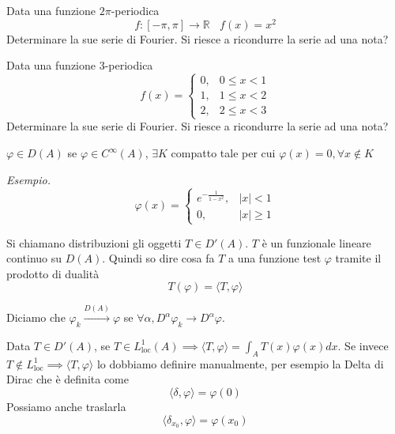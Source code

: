 Data una funzione $2\pi $-periodica
\begin{equation*}
f:[ -\pi ,\pi ]\rightarrow \mathbb{R} \ \ \ \ f(x)=x^{2}
\end{equation*}
Determinare la sue serie di Fourier. Si riesce a ricondurre la serie ad una nota?
\Esercizio{}

Data una funzione $3$-periodica
\begin{equation*}
f(x)=\begin{cases}
0, & 0\leq x< 1\\
1, & 1\leq x< 2\\
2, & 2\leq x< 3
\end{cases}
\end{equation*}
Determinare la sue serie di Fourier. Si riesce a ricondurre la serie ad una nota?
\Esercizio{}
\begin{defn}
 $\varphi \in D( A)$ se $\varphi \in C^{\infty }( A)$, $\exists K$ compatto tale per cui $\varphi ( x) =0,\forall x\notin K$
\end{defn}
\textit{Esempio.}
\begin{equation*}
\varphi ( x) =\begin{cases}
e^{-\frac{1}{1-x^{2}}} , & | x| < 1\\
0, & | x| \geqslant 1
\end{cases}
\end{equation*}
\begin{defn}
[Distribuzione] Si chiamano distribuzioni gli oggetti $T\in D'( A)$. $T$ è un funzionale lineare continuo su $D( A)$. Quindi so dire cosa fa $T$ a una funzione test $\varphi $ tramite il prodotto di dualità
\begin{equation*}
T( \varphi ) =\langle T,\varphi \rangle 
\end{equation*}
\end{defn}
\begin{defn}
 Diciamo che $\varphi _{k}\xrightarrow{D( A)} \varphi $ se $\forall \alpha ,D^{\alpha } \varphi _{k}\rightarrow D^{\alpha } \varphi $.
\end{defn}
\begin{defn}
 Data $T\in D'( A)$, se $T\in L^{1}_{\mathrm{loc}}( A) \implies \langle T,\varphi \rangle =\int _{A} T( x) \varphi ( x) dx$. Se invece $T\notin L^{1}_{\mathrm{loc}} \implies \langle T,\varphi \rangle $ lo dobbiamo definire manualmente, per esempio la Delta di Dirac che è definita come
\begin{equation*}
\langle \delta ,\varphi \rangle =\varphi ( 0)
\end{equation*}
Possiamo anche traslarla
\begin{equation*}
\langle \delta _{x_{0}} ,\varphi \rangle =\varphi ( x_{0})
\end{equation*}
\end{defn}
